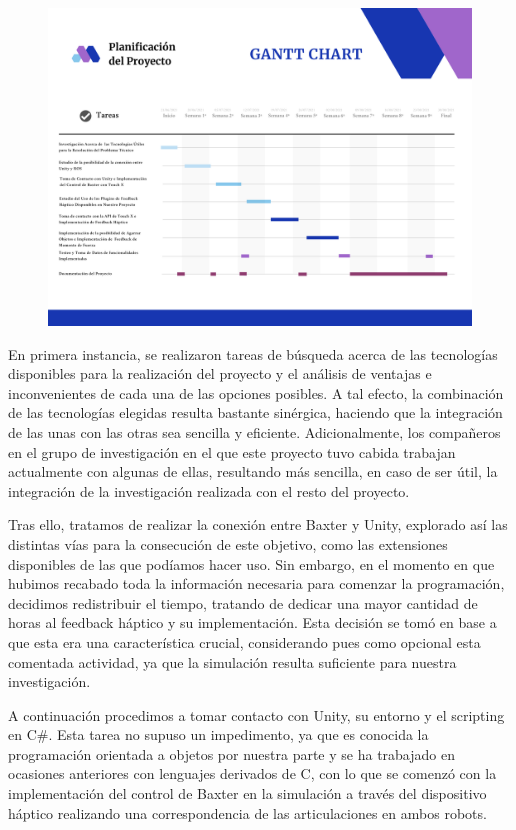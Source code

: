 \begin{figure}[hbt]
    \centering
    \includegraphics[width=1\textwidth]{imagenes/DiagramaGantt.png}
    \caption{}
    \label{fig:diagrama_gantt}
\end{figure}

En primera instancia, se realizaron tareas de búsqueda acerca de las tecnologías disponibles para la realización del proyecto y el análisis de ventajas e inconvenientes de cada una de las opciones posibles. A tal efecto, la combinación de las tecnologías elegidas resulta  bastante sinérgica, haciendo que la integración de las unas con las otras sea sencilla y eficiente. Adicionalmente, los compañeros en el grupo de investigación en el que este proyecto tuvo cabida trabajan actualmente con algunas de ellas, resultando más sencilla, en caso de ser útil, la integración de la investigación realizada con el resto del proyecto. 

Tras ello, tratamos de realizar la conexión entre Baxter y Unity, explorado así las distintas vías para la consecución de este objetivo, como las extensiones disponibles de las que podíamos hacer uso. Sin embargo, en el momento en que hubimos recabado toda la información necesaria para comenzar la programación, decidimos redistribuir el tiempo, tratando de dedicar una mayor cantidad de horas al feedback háptico y su implementación. Esta decisión se tomó en base a que esta era una característica crucial, considerando pues como opcional esta comentada actividad, ya que la simulación resulta suficiente para nuestra investigación.


A continuación procedimos a tomar contacto con Unity, su entorno y el scripting en C\#. Esta tarea no supuso un impedimento, ya que es conocida la programación orientada a objetos por nuestra parte y se ha trabajado  en ocasiones anteriores con lenguajes derivados de C, con lo que se comenzó con la implementación del control de Baxter en la simulación a través del dispositivo háptico realizando una correspondencia de las articulaciones en ambos robots.


